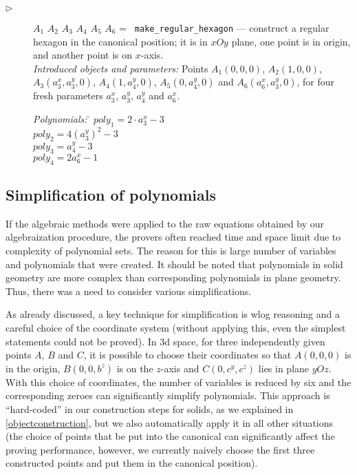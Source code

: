 \documentclass[final,1p,times,authoryear]{elsarticle}
\begin{document}
\begin{description}
\item[$\triangleright$] $A_1$ $A_2$ $A_3$ $A_4$ $A_5$ $A_6$ = {\tt
    make\_regular\_hexagon} --- construct a regular hexagon in the
  canonical position; it is in $xOy$ plane, one point is in origin,
  and another
  point is on $x$-axis. \\
  {\em Introduced objects and parameters:} Points $A_1(0, 0, 0)$,
  $A_2(1, 0, 0)$, $A_3(a_3^x, a_3^y, 0)$, $A_4(1, a_4^y, 0)$,
  $A_5(0, a_4^y, 0)$ and $A_6(a_6^x, a_3^y, 0)$, for four fresh
  parameters $a_3^x$, $a_3^y$, $a_4^y$ and $a_6^x$.

\begin{tabbing}
{\em Polynomials:} \= $poly_1 = 2\cdot a_3^x - 3$ \\
                   \> $poly_2 = 4(a_3^y)^2 - 3$ \\
                   \> $poly_3 = a_4^y - 3$ \\
                   \> $poly_4 = 2a_6^x - 1$
\end{tabbing}
\end{description}



\subsection{Simplification of polynomials}
\label{simplification}

If the algebraic methods were applied to the raw equations obtained by
our algebraization procedure, the provers often reached time and space
limit due to complexity of polynomial sets. The reason for this is
large number of variables and polynomials that were created. It should
be noted that polynomials in solid geometry are more complex than
corresponding polynomials in plane geometry. Thus, there was a need to
consider various simplifications.

As already discussed, a key technique for simplification is wlog
reasoning and a careful choice of the coordinate system (without
applying this, even the simplest statements could not be proved). In
3d space, for three independently given points $A$, $B$ and $C$, it is
possible to choose their coordinates so that $A(0, 0, 0)$ is in the
origin, $B(0, 0, b^z)$ is on the $z$-axis and $C(0, c^y, c^z)$ lies in
plane $yOz$. With this choice of coordinates, the number of variables
is reduced by six and the corresponding zeroes can significantly
simplify polynomials. This approach is ``hard-coded'' in our
construction steps for solids, as we explained in
\ref{objectconstruction}, but we also automatically apply it in all
other situations (the choice of points that be put into the canonical
can significantly affect the proving performance, however, we
currently naively choose the first three constructed points and put
them in the canonical position).
\end{document}
